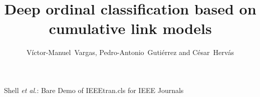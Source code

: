 \documentclass[journal]{IEEEtran}
\begin{document}
	\title{Deep ordinal classification based on cumulative link models}
	
	\author{Víctor-Manuel~Vargas, Pedro-Antonio~Gutiérrez and César~Hervás}
	
	
	
	
	{Shell \MakeLowercase{\textit{et al.}}: Bare Demo of IEEEtran.cls for IEEE Journals}
	
\end{document}
